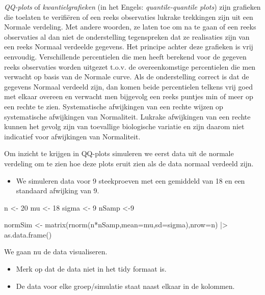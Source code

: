 \documentclass[
  dutch,
  letterpaper,
  12pt]{book}
\newenvironment{Shaded}{\begin{snugshade}}{\end{snugshade}}
\newcommand{\AttributeTok}[1]{\textcolor[rgb]{0.40,0.45,0.13}{#1}}
\newcommand{\DecValTok}[1]{\textcolor[rgb]{0.68,0.00,0.00}{#1}}
\newcommand{\FunctionTok}[1]{\textcolor[rgb]{0.28,0.35,0.67}{#1}}
\newcommand{\NormalTok}[1]{\textcolor[rgb]{0.00,0.23,0.31}{#1}}
\newcommand{\OtherTok}[1]{\textcolor[rgb]{0.00,0.23,0.31}{#1}}
\newcommand{\SpecialCharTok}[1]{\textcolor[rgb]{0.37,0.37,0.37}{#1}}
\providecommand{\tightlist}{%
  \setlength{\itemsep}{0pt}\setlength{\parskip}{0pt}}
\theoremstyle{definition}
\theoremstyle{definition}
\theoremstyle{definition}
\theoremstyle{remark}
\begin{document}
\emph{QQ-plots} of \emph{kwantielgrafieken} (in het Engels:
\emph{quantile-quantile plots}) zijn grafieken die toelaten te
verifiëren of een reeks observaties lukrake trekkingen zijn uit een
Normale verdeling. Met andere woorden, ze laten toe om na te gaan of een
reeks observaties al dan niet de onderstelling tegenspreken dat ze
realisaties zijn van een reeks Normaal verdeelde gegevens. Het principe
achter deze grafieken is vrij eenvoudig. Verschillende percentielen die
men heeft berekend voor de gegeven reeks observaties worden uitgezet
t.o.v. de overeenkomstige percentielen die men verwacht op basis van de
Normale curve. Als de onderstelling correct is dat de gegevens Normaal
verdeeld zijn, dan komen beide percentielen telkens vrij goed met elkaar
overeen en verwacht men bijgevolg een reeks puntjes min of meer op een
rechte te zien. Systematische afwijkingen van een rechte wijzen op
systematische afwijkingen van Normaliteit. Lukrake afwijkingen van een
rechte kunnen het gevolg zijn van toevallige biologische variatie en
zijn daarom niet indicatief voor afwijkingen van Normaliteit.

Om inzicht te krijgen in QQ-plots simuleren we eerst data uit de normale
verdeling om te zien hoe deze plots eruit zien als de data normaal
verdeeld zijn.

\begin{itemize}
\tightlist
\item
  We simuleren data voor 9 steekproeven met een gemiddeld van 18 en een
  standaard afwijking van 9.
\end{itemize}

\begin{Shaded}
\begin{Highlighting}[]
\NormalTok{n }\OtherTok{\textless{}{-}} \DecValTok{20}
\NormalTok{mu }\OtherTok{\textless{}{-}} \DecValTok{18}
\NormalTok{sigma }\OtherTok{\textless{}{-}} \DecValTok{9}
\NormalTok{nSamp }\OtherTok{\textless{}{-}}\DecValTok{9}

\NormalTok{normSim }\OtherTok{\textless{}{-}} \FunctionTok{matrix}\NormalTok{(}\FunctionTok{rnorm}\NormalTok{(n}\SpecialCharTok{*}\NormalTok{nSamp,}\AttributeTok{mean=}\NormalTok{mu,}\AttributeTok{sd=}\NormalTok{sigma),}\AttributeTok{nrow=}\NormalTok{n) }\SpecialCharTok{|\textgreater{}} \FunctionTok{as.data.frame}\NormalTok{()}
\end{Highlighting}
\end{Shaded}

We gaan nu de data visualiseren.

\begin{itemize}
\tightlist
\item
  Merk op dat de data niet in het tidy formaat is.
\item
  De data voor elke groep/simulatie staat naast elkaar in de kolommen.
\end{itemize}
\end{document}
